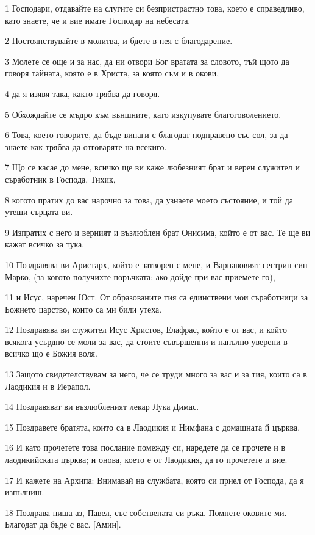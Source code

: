 \par 1 Господари, отдавайте на слугите си безпристрастно това, което е справедливо, като знаете, че и вие имате Господар на небесата.
\par 2 Постоянствувайте в молитва, и бдете в нея с благодарение.
\par 3 Молете се още и за нас, да ни отвори Бог вратата за словото, тъй щото да говоря тайната, която е в Христа, за която съм и в окови,
\par 4 да я изявя така, както трябва да говоря.
\par 5 Обхождайте се мъдро към външните, като изкупувате благоговолението.
\par 6 Това, което говорите, да бъде винаги с благодат подправено със сол, за да знаете как трябва да отговаряте на всекиго.
\par 7 Що се касае до мене, всичко ще ви каже любезният брат и верен служител и съработник в Господа, Тихик,
\par 8 когото пратих до вас нарочно за това, да узнаете моето състояние, и той да утеши сърцата ви.
\par 9 Изпратих с него и верният и възлюблен брат Онисима, който е от вас. Те ще ви кажат всичко за тука.
\par 10 Поздравява ви Аристарх, който е затворен с мене, и Варнавовият сестрин син Марко, (за когото получихте поръчката: ако дойде при вас приемете го),
\par 11 и Исус, наречен Юст. От образованите тия са единствени мои съработници за Божието царство, които са ми били утеха.
\par 12 Поздравява ви служител Исус Христов, Елафрас, който е от вас, и който всякога усърдно се моли за вас, да стоите съвършенни и напълно уверени в всичко що е Божия воля.
\par 13 Защото свидетелствувам за него, че се труди много за вас и за тия, които са в Лаодикия и в Иерапол.
\par 14 Поздравяват ви възлюбленият лекар Лука Димас.
\par 15 Поздравете братята, които са в Лаодикия и Нимфана с домашната й църква.
\par 16 И като прочетете това послание помежду си, наредете да се прочете и в лаодикийската църква; и онова, което е от Лаодикия, да го прочетете и вие.
\par 17 И кажете на Архипа: Внимавай на службата, която си приел от Господа, да я изпълниш.
\par 18 Поздрава пиша аз, Павел, със собствената си ръка. Помнете оковите ми. Благодат да бъде с вас. [Амин].

